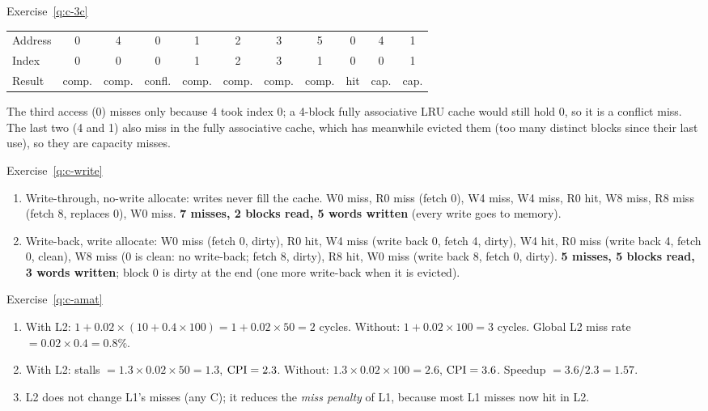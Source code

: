 \begin{noot}{Exercise~\ref{q:c-3c}}
\begin{center}
\small
\begin{tabular}{@{}lcccccccccc@{}}
\toprule
Address & 0 & 4 & 0 & 1 & 2 & 3 & 5 & 0 & 4 & 1 \\
Index & 0 & 0 & 0 & 1 & 2 & 3 & 1 & 0 & 0 & 1 \\
Result & comp. & comp. & confl. & comp. & comp. & comp. & comp. & hit & cap. & cap. \\
\bottomrule
\end{tabular}
\end{center}
The third access (0) misses only because 4 took index 0; a 4-block fully
associative LRU cache would still hold 0, so it is a conflict miss. The last two
(4 and 1) also miss in the fully associative cache, which has meanwhile evicted them
(too many distinct blocks since their last use), so they are capacity misses.
\end{noot}

\begin{noot}{Exercise~\ref{q:c-write}}
\begin{enumerate}[label=(\alph*),leftmargin=*]
  \item Write-through, no-write allocate: writes never fill the cache. W0 miss, R0
  miss (fetch 0), W4 miss, W4 miss, R0 hit, W8 miss, R8 miss (fetch 8, replaces 0),
  W0 miss. \textbf{7 misses, 2 blocks read, 5 words written} (every write goes to
  memory).
  \item Write-back, write allocate: W0 miss (fetch 0, dirty), R0 hit, W4 miss
  (write back 0, fetch 4, dirty), W4 hit, R0 miss (write back 4, fetch 0, clean), W8
  miss (0 is clean: no write-back; fetch 8, dirty), R8 hit, W0 miss (write back 8,
  fetch 0, dirty). \textbf{5 misses, 5 blocks read, 3 words written}; block 0 is
  dirty at the end (one more write-back when it is evicted).
\end{enumerate}
\end{noot}

\begin{noot}{Exercise~\ref{q:c-amat}}
\begin{enumerate}[label=(\alph*),leftmargin=*]
  \item With L2: $1+0.02\times(10+0.4\times100)=1+0.02\times50=2$ cycles. Without:
  $1+0.02\times100=3$ cycles. Global L2 miss rate $=0.02\times0.4=0.8\%$.
  \item With L2: stalls $=1.3\times0.02\times50=1.3$, $\mathrm{CPI}=2.3$. Without:
  $1.3\times0.02\times100=2.6$, $\mathrm{CPI}=3.6$. Speedup $=3.6/2.3=1.57$.
  \item L2 does not change L1's misses (any C); it reduces the \emph{miss penalty}
  of L1, because most L1 misses now hit in L2.
\end{enumerate}
\end{noot}

